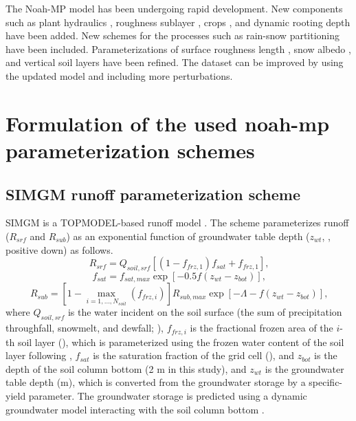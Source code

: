 \documentclass[essd, manuscript]{copernicus}
\let\unit\undefined
\begin{document}
The Noah-MP model has been undergoing rapid development. New components such as plant hydraulics \citep{li2021JAMESa}, roughness sublayer \citep{abolafia-rosenzweig2021JAMES}, crops \citep{liu2016JGRA}, and dynamic rooting depth \citep{liu2020JAMES} have been added. New schemes for the processes such as rain-snow partitioning \citep{wang2019GRL} have been included. Parameterizations of surface roughness length \citep{he2019JGRA, zhang2021IJC}, snow albedo \citep{wang2020JHd}, and vertical soil layers \citep{zhao2022ITGRS,shellito2020JH} have been refined. The dataset can be improved by using the updated model and including more perturbations.

\appendix

\section{Formulation of the used noah-mp parameterization schemes}\label{sec:app:noahmp}

\subsection{SIMGM runoff parameterization scheme}\label{sec:app:noahmp:simgm}

SIMGM is a TOPMODEL-based runoff model \citep{niu2007JGRa}. The scheme parameterizes runoff (\(R_{srf}\) and \(R_{sub}\)) as an exponential function of groundwater table depth (\(z_{wt}\), \unit{m}, positive down) as follows.
\begin{equation}
  R_{srf} = Q_{soil,srf} [(1 - f_{frz,1}) f_{sat} + f_{frz,1} ]
  \text{,} \label{eq:simgm:rsrf}
\end{equation}
\begin{equation}
  f_{sat} = f_{sat,max} \exp[-0.5 f (z_{wt} - z_{bot})]
  \text{,} \label{eq:simgm:fsat}
\end{equation}
\begin{equation}
  R_{sub} = [1 - \max_{i=1,\dots,N_{soil}} (f_{frz,i})] R_{sub,max}
  \exp[-\Lambda - f(z_{wt} - z_{bot})]
  \text{,} \label{eq:simgm:rsub}
\end{equation}
where \(Q_{soil,srf}\) is the water incident on the soil surface (the sum of precipitation throughfall, snowmelt, and dewfall; \unit{kg.m^{-2}.s^{-1}}), \(f_{frz,i}\) is the fractional frozen area of the \(i\)-th soil layer (\unit{m^2.m^{-2}}), which is parameterized using the frozen water content of the soil layer following \citet{niu2006JH}, \(f_{sat}\) is the saturation fraction of the grid cell (\unit{m^2.m^{-2}}), and \(z_{bot}\) is the depth of the soil column bottom (2 m in this study), and \(z_{wt}\) is the groundwater table depth (m), which is converted from the groundwater storage by a specific-yield parameter. The groundwater storage is predicted using a dynamic groundwater model interacting with the soil column bottom \citep{niu2007JGRa}.
\end{document}
